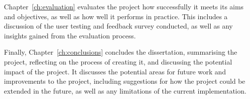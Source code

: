 \documentclass[../main.tex]{subfiles}
\begin{document}
        Chapter~\ref{ch:evaluation} evaluates the project how successfully it meets its
            aims and objectives, as well as how well it performs in practice.
        This includes a discussion of the user testing and feedback survey conducted,
            as well as any insights gained from the evaluation process.

        Finally, Chapter~\ref{ch:conclusions} concludes the dissertation, summarising
            the project, reflecting on the process of creating it, and discussing the
            potential impact of the project.
        It discusses the potential areas for future work and improvements to the
            project, including suggestions for how the project could be extended in the
            future, as well as any limitations of the current implementation.
\end{document}
